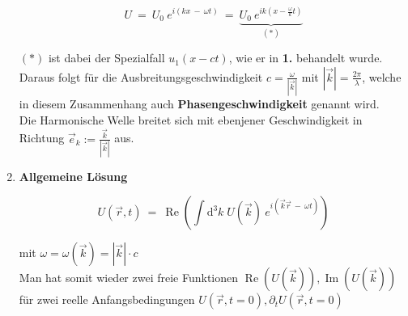 \begin{enumerate}[label=\textbf{\arabic* .}]
	\begin{equation*}
	U \ = \ U_0 \ e^{i(kx \ - \ \omega t)} \ = \ \underbrace{U_0 \ e^{ik\left(x-\frac{\omega}{k}t\right)} }_{(*)}
	\end{equation*}
	
	$(*)$ ist dabei der Spezialfall $u_1(x-ct)$, wie er in \textbf{1.} behandelt wurde.\\
	Daraus folgt für die Ausbreitungsgeschwindigkeit $c =\frac{\omega}{|\vec{k}|}$ mit $|\vec{k}|=\frac{2\pi}{\lambda}$, welche in diesem Zusammenhang auch \textbf{Phasengeschwindigkeit} genannt wird.\\
	Die Harmonische Welle breitet sich mit ebenjener Geschwindigkeit in Richtung $\vec{e}_k := \frac{\vec{k}}{|\vec{k}|}$ aus.
	
	\item \textbf{Allgemeine Lösung}
	
	\begin{equation*}
	U(\vec{r},t) \ = \ \operatorname{Re} \left(\int\mathrm{d}^3 k \; U(\vec{k}) \ e^{i(\vec{k}\vec{r} \ - \ \omega t)}\right)
	\end{equation*}
	
	mit $\omega = \omega(\vec{k}) = |\vec{k}| \cdot c$\\
	Man hat somit wieder zwei freie Funktionen $\operatorname{Re}(U(\vec{k})), \operatorname{Im}(U(\vec{k}))$ für zwei reelle Anfangsbedingungen $U(\vec{r},t=0), \partial_t U(\vec{r},t=0)$
	
\end{enumerate}


